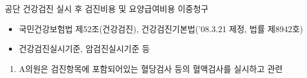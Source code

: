 \begin{commentbox}{공단 건강검진 실시 후 검진비용 및 요양급여비용 이중청구}
\begin{description}\tightlist
\item[관련근거] 
\begin{itemize}\tightlist
\item 국민건강보험법 제52조(건강검진), 건강검진기본법('08.3.21 제정, 법률 제8942호)
\item 건강검진실시기준, 암검진실시기준 등
\end{itemize}
\item[부당사례]
\begin{enumerate}[1)]\tightlist
\item  A의원은 검진항목에 포함되어있는 혈당검사 등의 혈액검사를 실시하고 관련 
\end{enumerate}
\end{description}
\end{commentbox}

